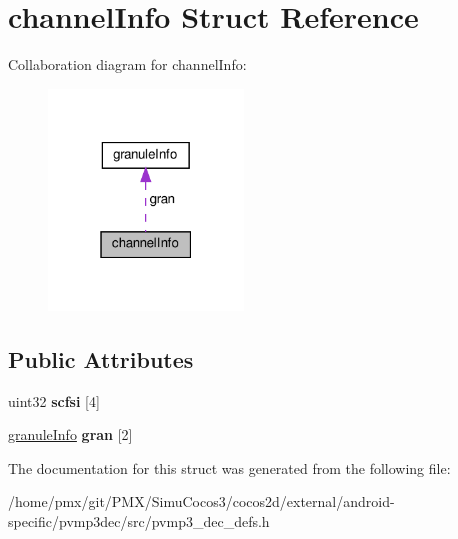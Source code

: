 \hypertarget{structchannelInfo}{}\section{channel\+Info Struct Reference}
\label{structchannelInfo}


Collaboration diagram for channel\+Info\+:
\nopagebreak
\begin{figure}[H]
\begin{center}
\leavevmode
\includegraphics[width=147pt]{structchannelInfo__coll__graph}
\end{center}
\end{figure}
\subsection*{Public Attributes}
\begin{DoxyCompactItemize}
\item 
\mbox{\label{structchannelInfo_a4f229c26a4e0ae52cbb03be545f8b907}} 
uint32 {\bfseries scfsi} \mbox{[}4\mbox{]}
\item 
\mbox{\label{structchannelInfo_ac47086c55f46fe9ad57c27b24839681b}} 
\hyperlink{structgranuleInfo}{granule\+Info} {\bfseries gran} \mbox{[}2\mbox{]}
\end{DoxyCompactItemize}


The documentation for this struct was generated from the following file\+:\begin{DoxyCompactItemize}
\item 
/home/pmx/git/\+P\+M\+X/\+Simu\+Cocos3/cocos2d/external/android-\/specific/pvmp3dec/src/pvmp3\+\_\+dec\+\_\+defs.\+h\end{DoxyCompactItemize}
